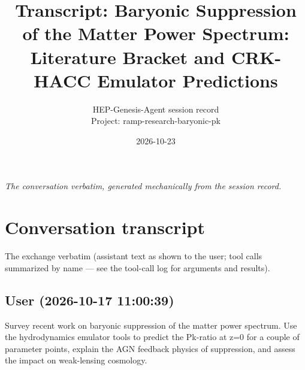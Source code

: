 \documentclass[11pt,a4paper]{article}
\title{Transcript: Baryonic Suppression of the Matter Power Spectrum: Literature Bracket and CRK-HACC Emulator Predictions}
\author{HEP-Genesis-Agent session record \\ \small Project: ramp-research-baryonic-pk}
\date{2026-10-23}
\begin{document}
\maketitle
\noindent\textit{\small The conversation verbatim, generated mechanically from the session record.}
\vspace{1em}



\appendix
\section{Conversation transcript}
\label{app:transcript}
The exchange verbatim (assistant text as shown to the user; tool calls summarized by name --- see the tool-call log for arguments and results).
\subsection*{User \small(2026-10-17 11:00:39)}
Survey recent work on baryonic suppression of the matter power spectrum. Use the hydrodynamics emulator tools to predict the Pk-ratio at z=0 for a couple of parameter points, explain the AGN feedback physics of suppression, and assess the impact on weak-lensing cosmology.
\end{document}
